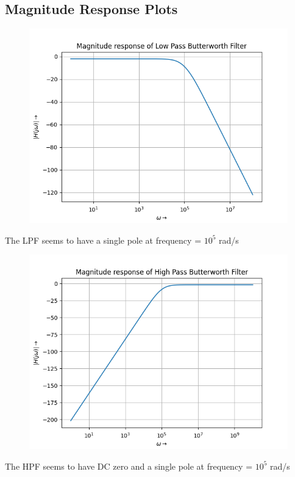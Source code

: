 \documentclass[12pt, a4paper]{article}
\begin{document}
\subsection{Magnitude Response Plots}
\vspace*{-0.5cm}
\begin{figure}[H]
    \centering
    \includegraphics[scale = 0.8]{Figure_1.png}
    \label{fig:sample}
\end{figure}
\begin{center}
    The LPF seems to have a single pole at frequency = $10^{5}$ rad/s
\end{center}
\vspace*{-1.5cm}
\begin{figure}[H]
    \centering
    \includegraphics[scale = 0.8]{Figure_4.png}
    \label{fig:sample}
\end{figure}
\begin{center}
    The HPF seems to have DC zero and a single pole at frequency = $10^{5}$ rad/s
\end{center}
\end{document}
